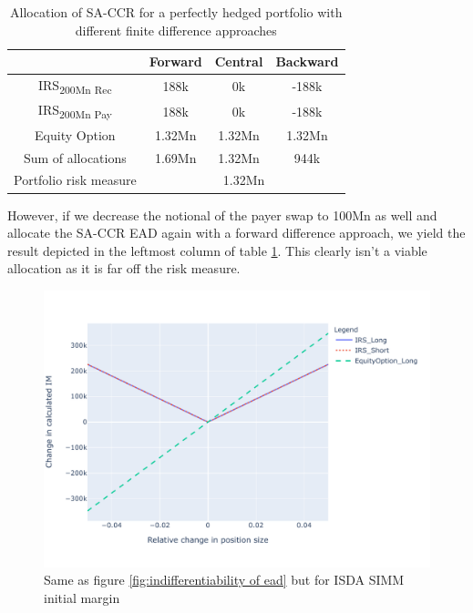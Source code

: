 \documentclass[../Thesis_AHoecherl.tex]{subfiles}
\begin{document}
    \begin{table}[htbp]
        \centering
        \begin{tabular}{c|c|c|c}
            & Forward & Central & Backward \\
            \toprule
            IRS\textsubscript{200Mn Rec} & 188k & 0k & -188k \\
            \midrule
                IRS\textsubscript{200Mn Pay} & 188k & 0k & -188k\\
                \midrule
                Equity Option & 1.32Mn & 1.32Mn & 1.32Mn\\
                \bottomrule
                Sum of allocations & 1.69Mn & 1.32Mn & 944k \\
                \midrule
                Portfolio risk measure & \multicolumn{3}{c}{1.32Mn} \\
            \end{tabular}%
            \caption[Allocation of \gls{SA-CCR} for a perfectly hedged portfolio]{Allocation of \gls{SA-CCR} for a perfectly hedged portfolio with different finite difference approaches}
            \label{tab:EAD perfect hedge}
    \end{table}

    However, if we decrease the notional of the payer swap to 100Mn as well and allocate the \gls{SA-CCR} \gls{EAD} again with a forward difference approach, we yield the result depicted in the leftmost column of table \ref{tab:EAD perfect hedge}. This clearly isn't a viable allocation as it is far off the risk measure.
    
    \begin{figure}
        \centering
        \includegraphics{Graphics/Indifferentiabililty_of_IM.pdf}
        \caption[Non-differentiability of \gls{ISDA SIMM}]{Same as figure \ref{fig:indifferentiability of ead} but for \gls{ISDA SIMM} initial margin}
        \label{fig:indifferentiability of im}
    \end{figure}
\end{document}
